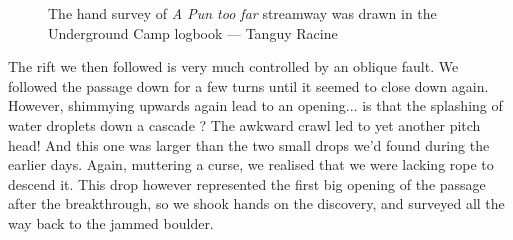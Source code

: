 \begin{figure}[t!]
\checkoddpage \ifoddpage \forcerectofloat \else \forceversofloat \fi
\centering
{}
\caption{The hand survey of \emph{A Pun too far} streamway was drawn in the Underground Camp logbook --- Tanguy Racine}
\label{Notebook}
\end{figure}

The rift we then followed is very much controlled by an oblique fault. We followed the passage down for a few turns until it seemed to close down again. However, shimmying upwards again lead to an opening... is that the splashing of water droplets down a cascade ? The awkward crawl led to yet another pitch head!
And this one was larger than the two small drops we'd found during the earlier days. Again, muttering a curse, we realised that we were lacking rope to descend it. This drop however represented the first big opening of the passage after the breakthrough, so we shook hands on the discovery, and surveyed all the way back to the jammed boulder.

